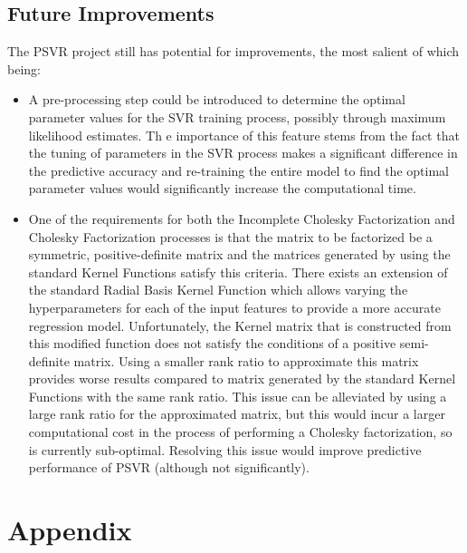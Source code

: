\documentclass[12pt]{article}
\newcounter{reportpage}
\begin{document}
\subsection{Future Improvements}
The PSVR project still has potential for improvements, the most salient of which being:
\begin{itemize}
\item A pre-processing step could be introduced to determine the optimal parameter values for the SVR training process, possibly through maximum likelihood estimates. Th e importance of this feature stems from the fact that the tuning of parameters in the SVR process makes a significant difference in the predictive accuracy and re-training the entire model to find the optimal parameter values would significantly increase the computational time.
\item One of the requirements for both the Incomplete Cholesky Factorization and Cholesky Factorization processes is that the matrix to be factorized be a symmetric, positive-definite matrix and the matrices generated by using the standard Kernel Functions satisfy this criteria. There exists an extension of the standard Radial Basis Kernel Function which allows varying the hyperparameters for each of the input features to provide a more accurate regression model. Unfortunately, the Kernel matrix that is constructed from this modified function does not satisfy the conditions of a positive semi-definite matrix. Using a smaller rank ratio to approximate this matrix provides worse results compared to matrix generated by the standard Kernel Functions with the same rank ratio. This issue can be alleviated by using a large rank ratio for the approximated matrix, but this would incur a larger computational cost in the process of performing a Cholesky factorization, so is currently sub-optimal. Resolving this issue would improve predictive performance of PSVR (although not significantly).
\end{itemize}
\cleardoublepage
{}
\setcounter{page}{\value{reportpage}}
\section{Appendix}
\end{document}
